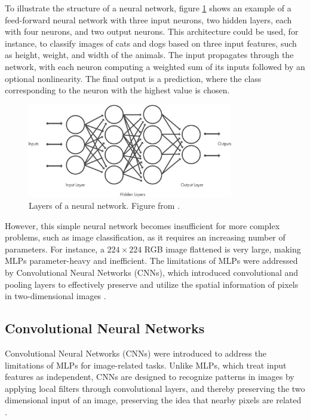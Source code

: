 To illustrate the structure of a neural network, figure \ref{fig:dnn_layers} shows an example of a feed-forward neural network with three input neurons, two hidden layers, each with four neurons, and two output neurons. This architecture could be used, for instance, to classify images of cats and dogs based on three input features, such as height, weight, and width of the animals. The input propagates through the network, with each neuron computing a weighted sum of its inputs followed by an optional nonlinearity. The final output is a prediction, where the class corresponding to the neuron with the highest value is chosen.

\begin{figure}[ht]
    \centering
    \includegraphics[width=0.8\textwidth]{Images/cnn_layers.jpg} 
    \caption{Layers of a neural network. Figure from \cite{mathworks_cnn}. }
    \label{fig:dnn_layers}
\end{figure}

However, this simple neural network becomes insufficient for more complex problems, such as image classification, as it requires an increasing number of parameters. For instance, a $224\times 224$ RGB image flattened is very large, making MLPs parameter-heavy and inefficient. The limitations of MLPs were addressed by Convolutional Neural Networks (CNNs), which introduced convolutional and pooling layers to effectively preserve and utilize the spatial information of pixels in two-dimensional images \cite{zhang2023dive}.



\subsection{Convolutional Neural Networks}
\label{sec:CNNs}
Convolutional Neural Networks (CNNs) \cite{lecun1995} were introduced to address the limitations of MLPs for image-related tasks. Unlike MLPs, which treat input features as independent, CNNs are designed to recognize patterns in images by applying local filters through convolutional layers, and thereby preserving the two dimensional input of an image, preserving the idea that nearby pixels are related \cite{lecun1998,NIPS2012_c399862d,zhang2023dive}. 

